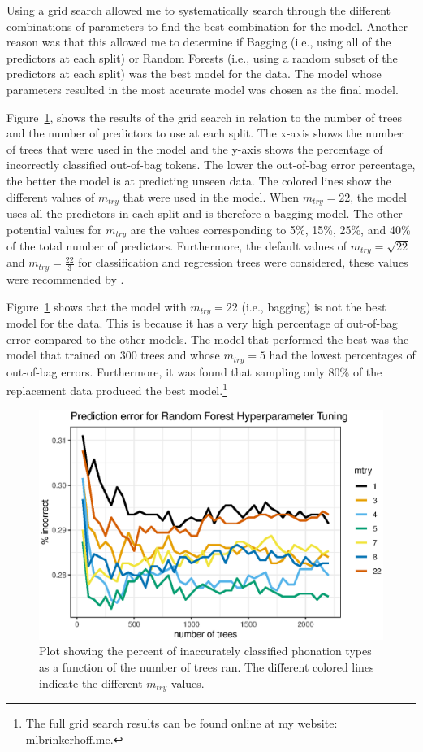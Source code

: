 Using a grid search allowed me to systematically search through the different combinations of parameters to find the best combination for the model. Another reason was that this allowed me to determine if Bagging (i.e., using all of the predictors at each split) or Random Forests (i.e., using a random subset of the predictors at each split) was the best model for the data. The model whose parameters resulted in the most accurate model was chosen as the final model. 

Figure~\ref{fig:mtry_number}, shows the results of the grid search in relation to the number of trees and the number of predictors to use at each split. The x-axis shows the number of trees that were used in the model and the y-axis shows the percentage of incorrectly classified out-of-bag tokens. The lower the out-of-bag error percentage, the better the model is at predicting unseen data. The colored lines show the different values of $m_{try}$ that were used in the model. When $m_{try} = 22$, the model uses all the predictors in each split and is therefore a bagging model. The other potential values for $m_{try}$ are the values corresponding to 5\%, 15\%, 25\%, and 40\% of the total number of predictors. Furthermore, the default values of $m_{try} = \sqrt{22}$ and $m_{try} = \frac{22}{3}$ for classification and regression trees were considered, these values were recommended by \citet{boehmkeHandsOnMachineLearning2019}. 

Figure~\ref{fig:mtry_number} shows that the model with $m_{try} = 22$ (i.e., bagging) is not the best model for the data. This is because it has a very high percentage of out-of-bag error compared to the other models. The model that performed the best was the model that trained on 300 trees and whose $m_{try} = 5$ had the lowest percentages of out-of-bag errors. Furthermore, it was found that sampling only 80\% of the replacement data produced the best model.\footnote{The full grid search results can be found online at my website: \href{mlbrinkerhoff.me}{mlbrinkerhoff.me}.}

\begin{figure}[h!]
    \centering
    \includegraphics[width = 0.9\linewidth]{images/RandomForest/tree_num_dur.eps}
    \caption{Plot showing the percent of inaccurately classified phonation types as a function of the number of trees ran. The different colored lines indicate the different $m_{try}$ values.}
    \label{fig:mtry_number}
\end{figure}

